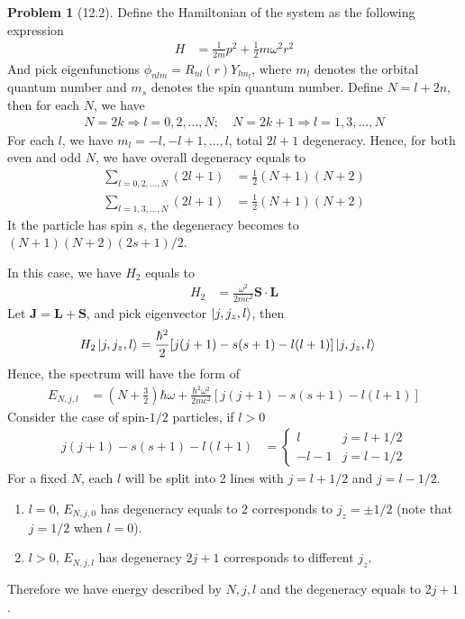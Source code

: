\documentclass[twoside,11pt]{article}
\theoremstyle{definition}
\newtheorem{problem}{Problem}
\theoremstyle{remark}
\begin{document}
\begin{problem}[12.2] 
Define the Hamiltonian of the system as the following expression
\begin{align*}
    H &= \frac{1}{2m}p^2 + \frac{1}{2}m\omega^2 r^2
\end{align*}
And pick eigenfunctions $\phi_{nlm}=R_{nl}(r)Y_{lm_l}$,
where $m_l$ denotes the orbital quantum number and 
$m_s$ denotes the spin quantum number.
Define $N=l+2n$, then for each $N$, we have
\begin{align*}
    N = 2k\Rightarrow l = 0, 2, \dots, N;
    \quad
    N = 2k+1\Rightarrow l = 1, 3, \dots, N
\end{align*}
For each $l$, we have $m_l=-l,-l+1,\dots, l$,
total $2l+1$ degeneracy.
Hence, for both even and odd $N$, we have overall
degeneracy equals to 
\begin{align*}
    \sum_{l=0,2,\dots,N}(2l+1) &= \frac{1}{2}(N+1)(N+2)\\
    \sum_{l=1,3,\dots,N}(2l+1) &= \frac{1}{2}(N+1)(N+2)
\end{align*}
It the particle has spin $s$, the degeneracy becomes to
$(N+1)(N+2)(2s+1)/2$.

In this case, we have $H_2$ equals to
\begin{align*}
    H_2 &= \frac{\omega^2}{2mc^2}\mathbf{S}\cdot\mathbf{L}
\end{align*}
Let $\mathbf{J}=\mathbf{L}+\mathbf{S}$, and pick eigenvector $\ket{j,j_z,l}$, then
\begin{align*}
    H_2\ket{j,j_z,l} &= 
    \frac{\hbar^2}{2}[j(j+1)-s(s+1)-l(l+1)]\ket{j,j_z,l}
\end{align*}
Hence, the spectrum will have the form of
\begin{align*}
    E_{N,j,l} &= 
    \left(N+\frac{3}{2}\right)\hbar\omega 
    + \frac{\hbar^2\omega^2}{2mc^2}[j(j+1)-s(s+1)-l(l+1)]
\end{align*}
Consider the case of spin-$1/2$ particles, if $l>0$
\begin{align*}
    j(j+1)-s(s+1)-l(l+1) &= \begin{cases}
        l & j = l + 1/2\\
        -l-1 & j = l - 1/2
    \end{cases}
\end{align*}
For a fixed $N$, each $l$ will be split into 2 lines
with $j=l+1/2$ and $j=l-1/2$.
\begin{enumerate}[label=(\alph*)]
    \item $l=0$, $E_{N,j,0}$ has degeneracy equals to $2$ corresponds 
    to $j_z=\pm 1/2$ (note that $j=1/2$ when $l=0$).
    \item $l>0$, $E_{N,j,l}$ has degeneracy $2j+1$ corresponds to different $j_z$.
\end{enumerate}
Therefore we have energy described by $N,j,l$ and the degeneracy equals to $2j+1$.


\end{problem}
\end{document}
